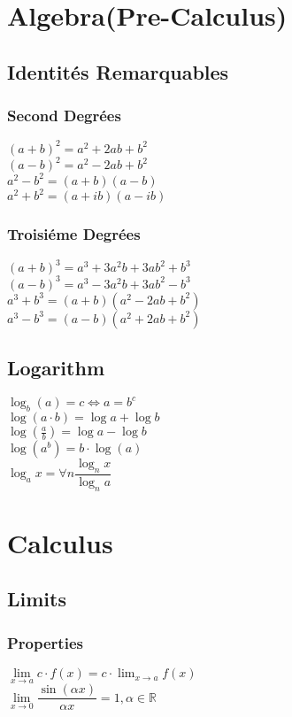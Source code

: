 \documentclass[5pt]{article}
\begin{document}
\begin{multicols}{3}
\section{Algebra\footnotesize{(Pre-Calculus)}}
\subsection{Identités Remarquables}
\subsubsection{Second Degrées}
$(a+b)^2=a^2+2ab+b^2$\\
$(a-b)^2=a^2-2ab+b^2$\\
$a^2-b^2=(a+b)(a-b)$\\
$a^2+b^2=(a+ib)(a-ib)$

\subsubsection{Troisiéme Degrées}
$(a+b)^3 = a^3+3a^2b+3ab^2+b^3$\\
$(a-b)^3 = a^3-3a^2b+3ab^2-b^3$\\
$a^3+b^3 = (a+b)(a^2-2ab+b^2)$\\
$a^3-b^3 = (a-b)(a^2+2ab+b^2)$

\subsection{Logarithm}
$\log_b(a)= c\Leftrightarrow a=b^c$\\
$\log(a\cdot b)=\log{a} + \log{b}$\\
$\log(\frac{a}{b})=\log{a}-\log{b}$\\
$\log(a^b)=b\cdot\log(a)$\\
$\log_a{x}=\forall{n}\dfrac{\log_n{x}}{\log_n{a}}$

\section{Calculus}
\subsection{Limits}
\subsubsection{Properties}
\(\lim\limits_{x\to a} c\cdot f(x) = c\cdot \lim_{x\to a} f(x)\)\\
\(\lim\limits_{x\to 0} \dfrac{\sin(\alpha x)}{\alpha x}=1, \alpha\in\mathbb{R}\)


\end{multicols}
\end{document}
